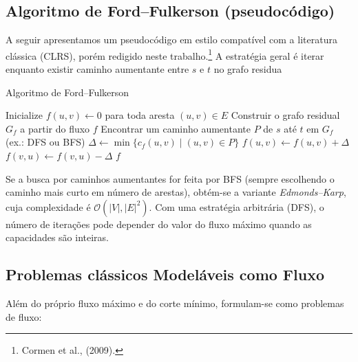 \documentclass[12pt]{article}
\begin{document}
\subsection{Algoritmo de Ford–Fulkerson (pseudocódigo)} 

A seguir apresentamos um pseudocódigo em estilo compatível com a literatura clássica (CLRS), porém redigido neste trabalho.\footnote{Cormen et al., (2009).} A estratégia geral é iterar enquanto existir caminho aumentante entre $s$ e $t$ no grafo residua

\begin{algorithm}[H]
\caption{Algoritmo de Ford–Fulkerson}
\label{alg:ford_fulkerson}
\begin{algorithmic}[1]
    \State Inicialize $f(u,v) \gets 0$ para toda aresta $(u,v) \in E$
        \State Construir o grafo residual $G_f$ a partir do fluxo $f$
        \State Encontrar um caminho aumentante $P$ de $s$ até $t$ em $G_f$ (ex.: DFS ou BFS)
        \State $\Delta \gets \min\{c_f(u,v) \mid (u,v) \in P\}$ 
            \State $f(u,v) \gets f(u,v) + \Delta$ 
            \State $f(v,u) \gets f(v,u) - \Delta$ 
        \EndFor
    \EndWhile
    \State \Return $f$ 
\EndProcedure
\end{algorithmic}
\end{algorithm}



\noindent Se a busca por caminhos aumentantes for feita por BFS (sempre escolhendo o caminho mais curto em número de arestas), obtém-se a variante \emph{Edmonds–Karp}, cuja complexidade é $\mathcal{O}(|V|,|E|^2)$. Com uma estratégia arbitrária (DFS), o número de iterações pode depender do valor do fluxo máximo quando as capacidades são inteiras.


\subsection{Problemas clássicos Modeláveis como Fluxo} 

Além do próprio fluxo máximo e do corte mínimo, formulam-se como problemas de fluxo: 
\end{document}
